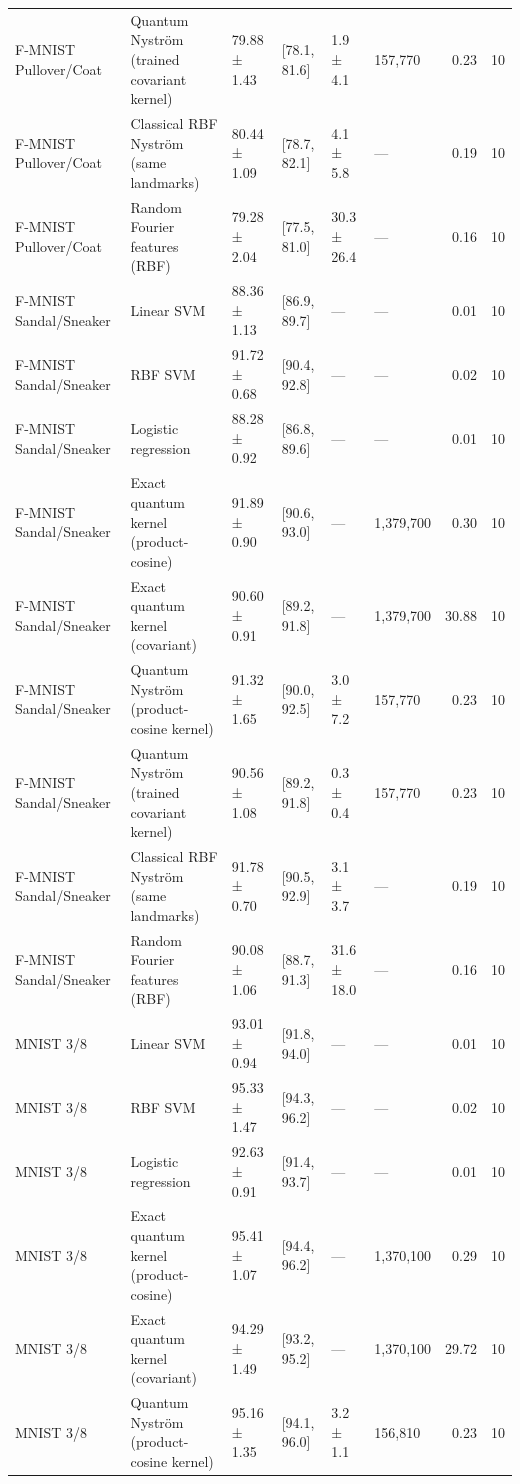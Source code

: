 \begin{table}
\begin{tabular}{llllllrr}
F-MNIST Pullover/Coat & Quantum Nyström (trained covariant kernel) & 79.88 ± 1.43 & [78.1, 81.6] & 1.9 ± 4.1 & 157,770 & 0.23 & 10 \\
F-MNIST Pullover/Coat & Classical RBF Nyström (same landmarks) & 80.44 ± 1.09 & [78.7, 82.1] & 4.1 ± 5.8 & — & 0.19 & 10 \\
F-MNIST Pullover/Coat & Random Fourier features (RBF) & 79.28 ± 2.04 & [77.5, 81.0] & 30.3 ± 26.4 & — & 0.16 & 10 \\
F-MNIST Sandal/Sneaker & Linear SVM & 88.36 ± 1.13 & [86.9, 89.7] & — & — & 0.01 & 10 \\
F-MNIST Sandal/Sneaker & RBF SVM & 91.72 ± 0.68 & [90.4, 92.8] & — & — & 0.02 & 10 \\
F-MNIST Sandal/Sneaker & Logistic regression & 88.28 ± 0.92 & [86.8, 89.6] & — & — & 0.01 & 10 \\
F-MNIST Sandal/Sneaker & Exact quantum kernel (product-cosine) & 91.89 ± 0.90 & [90.6, 93.0] & — & 1,379,700 & 0.30 & 10 \\
F-MNIST Sandal/Sneaker & Exact quantum kernel (covariant) & 90.60 ± 0.91 & [89.2, 91.8] & — & 1,379,700 & 30.88 & 10 \\
F-MNIST Sandal/Sneaker & Quantum Nyström (product-cosine kernel) & 91.32 ± 1.65 & [90.0, 92.5] & 3.0 ± 7.2 & 157,770 & 0.23 & 10 \\
F-MNIST Sandal/Sneaker & Quantum Nyström (trained covariant kernel) & 90.56 ± 1.08 & [89.2, 91.8] & 0.3 ± 0.4 & 157,770 & 0.23 & 10 \\
F-MNIST Sandal/Sneaker & Classical RBF Nyström (same landmarks) & 91.78 ± 0.70 & [90.5, 92.9] & 3.1 ± 3.7 & — & 0.19 & 10 \\
F-MNIST Sandal/Sneaker & Random Fourier features (RBF) & 90.08 ± 1.06 & [88.7, 91.3] & 31.6 ± 18.0 & — & 0.16 & 10 \\
MNIST 3/8 & Linear SVM & 93.01 ± 0.94 & [91.8, 94.0] & — & — & 0.01 & 10 \\
MNIST 3/8 & RBF SVM & 95.33 ± 1.47 & [94.3, 96.2] & — & — & 0.02 & 10 \\
MNIST 3/8 & Logistic regression & 92.63 ± 0.91 & [91.4, 93.7] & — & — & 0.01 & 10 \\
MNIST 3/8 & Exact quantum kernel (product-cosine) & 95.41 ± 1.07 & [94.4, 96.2] & — & 1,370,100 & 0.29 & 10 \\
MNIST 3/8 & Exact quantum kernel (covariant) & 94.29 ± 1.49 & [93.2, 95.2] & — & 1,370,100 & 29.72 & 10 \\
MNIST 3/8 & Quantum Nyström (product-cosine kernel) & 95.16 ± 1.35 & [94.1, 96.0] & 3.2 ± 1.1 & 156,810 & 0.23 & 10 \\

\end{tabular}
\end{table}
